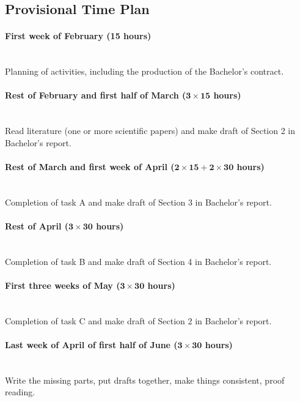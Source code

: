 \documentclass{article}
\newcommand{\timeest}[1]{$\mathbf{#1}$}%
\begin{document}
\subsection*{Provisional Time Plan}

\paragraph{First week of February (15 hours)}~\\\noindent
Planning of activities, including the production of the Bachelor's contract.

\paragraph{Rest of February and first half of March (\timeest{3\times 15} hours)}~\\\noindent
Read literature (one or more scientific papers) and make draft of Section 2 in Bachelor's report.

\paragraph{Rest of March and first week of April (\timeest{2\times 15+2\times 30} hours)}~\\\noindent
Completion of task A and make draft of Section 3 in Bachelor's report.

\paragraph{Rest of April (\timeest{3\times 30} hours)}~\\\noindent
Completion of task B and make draft of Section 4 in Bachelor's report.

\paragraph{First three weeks of May (\timeest{3\times 30} hours)}~\\\noindent
Completion of task C and make draft of Section 2 in Bachelor's report.

\paragraph{Last week of April of first half of June (\timeest{3\times 30} hours)}~\\\noindent
Write the missing parts, put drafts together, make things consistent, proof reading.
\end{document}
